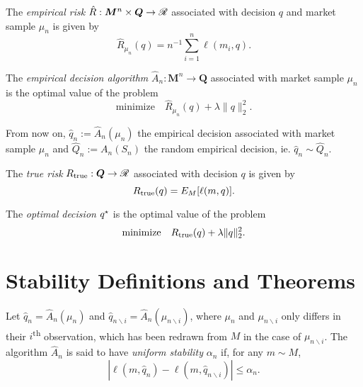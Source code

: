\documentclass[11pt]{article}
\begin{document}
\begin{deff}
  The \textsl{empirical risk} $\hat R: \bm M^n\times \bm Q \to \mathscr{R}$ associated with decision
  $q$ and market sample $\mu_n$ is given by
 \begin{equation*}
   \hat R_{\mu_n}(q) = n^{-1} \sum_{i=1}^n \ell(m_i,q).
 \end{equation*}
\end{deff}

\begin{deff}
  The \textsl{empirical decision algorithm} $\hat A_n:\bm M^n \to \bm Q$ associated with
  market sample $\mu_n$ is the optimal value of the problem
  \begin{equation*}
    \text{minimize}\quad\hat R_{\mu_n}(q) + \lambda\|q\|_2^2.
  \end{equation*}
\end{deff}

From now on, $\hat q_n := \hat A_n(\mu_n)$ the empirical decision associated with market sample
$\mu_n$ and $\hat Q_n := A_n(S_n)$ the random empirical decision, ie. $\hat q_n \sim \hat Q_n$.

\begin{deff}
  The \textsl{true risk} $R_{\mathrm{true}}:\bm Q\to\mathscr{R}$ associated with decision $q$ is given by
  \begin{equation*}
    R_{\mathrm{true}}(q) = E_M[\ell(m,q)].
  \end{equation*}
\end{deff}

\begin{deff}
  The \textsl{optimal decision} ${q^\star}$ is the optimal value of the problem
  \begin{equation*}
    \text{minimize}\quad R_{\mathrm{true}}(q) + \lambda\|q\|_2^2.
  \end{equation*}
\end{deff}


\section{Stability Definitions and Theorems}

\begin{deff}
  Let $\hat q_n=\hat A_n(\mu_n)$ and
  $\hat q_{n\backslash i}=\hat A_n(\mu_{n\backslash i})$, where $\mu_n$ and
  $\mu_{n\backslash i}$ only differs in their $i$\textsuperscript{th} observation, which
  has been redrawn from $M$ in the case of $\mu_{n\backslash i}$. The algorithm $\hat A_n$
  is said to have \textsl{uniform stability} $\alpha_n$ if, for any $m\sim M$,
  \begin{equation*}
    |\ell(m,\hat q_n) - \ell(m,\hat q_{n\backslash i})| \leq \alpha_n. 
  \end{equation*}
\end{deff}
\end{document}
